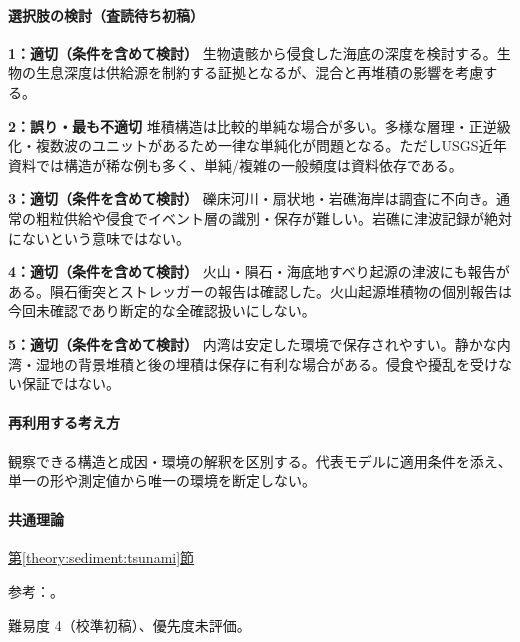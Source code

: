 \paragraph{選択肢の検討（査読待ち初稿）}\mbox{}\par

\noindent\textbf{1：適切（条件を含めて検討）} 生物遺骸から侵食した海底の深度を検討する。生物の生息深度は供給源を制約する証拠となるが、混合と再堆積の影響を考慮する。\par

\noindent\textbf{2：誤り・最も不適切} 堆積構造は比較的単純な場合が多い。多様な層理・正逆級化・複数波のユニットがあるため一律な単純化が問題となる。ただしUSGS近年資料では構造が稀な例も多く、単純/複雑の一般頻度は資料依存である。\par

\noindent\textbf{3：適切（条件を含めて検討）} 礫床河川・扇状地・岩礁海岸は調査に不向き。通常の粗粒供給や侵食でイベント層の識別・保存が難しい。岩礁に津波記録が絶対にないという意味ではない。\par

\noindent\textbf{4：適切（条件を含めて検討）} 火山・隕石・海底地すべり起源の津波にも報告がある。隕石衝突とストレッガーの報告は確認した。火山起源堆積物の個別報告は今回未確認であり断定的な全確認扱いにしない。\par

\noindent\textbf{5：適切（条件を含めて検討）} 内湾は安定した環境で保存されやすい。静かな内湾・湿地の背景堆積と後の埋積は保存に有利な場合がある。侵食や擾乱を受けない保証ではない。\par

\paragraph{再利用する考え方} 観察できる構造と成因・環境の解釈を区別する。代表モデルに適用条件を添え、単一の形や測定値から唯一の環境を断定しない。

\paragraph{共通理論} \hyperref[theory:sediment:tsunami]{第\ref*{theory:sediment:tsunami}節}

\par 参考：\cite{sed_tsunami_fujino,sed_tsunami_usgs,sed_tsunami_2002,sed_tsunami_gsj_survey}。

\par 難易度 4（校準初稿）、優先度未評価。

